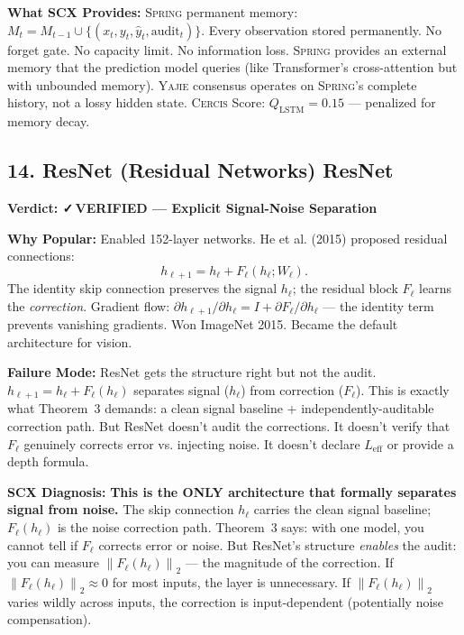 \documentclass[12pt,a4paper]{article}
\theoremstyle{definition}
\newcommand{\verified}{{\color{verifiedcolor}\textbf{✓\,VERIFIED}}}
\newcommand{\Yajie}{\textsc{Yajie}}
\newcommand{\Spring}{\textsc{Spring}}
\newcommand{\Cercis}{\textsc{Cercis}}
\newcommand{\norm}[1]{\left\lVert#1\right\rVert}
\newcommand{\auditHeader}[1]{\medskip\noindent\textbf{\large #1}\medskip}
\newcommand{\whyPopular}{\noindent\textbf{Why Popular:} }
\newcommand{\whyFail}{\noindent\textbf{Failure Mode:} }
\newcommand{\whatMissing}{\noindent\textbf{What SCX Provides:} }
\newcommand{\diagnosis}{\noindent\textbf{SCX Diagnosis:} }
\begin{document}
\whatMissing{} \Spring{} permanent memory: $M_t = M_{t-1} \cup \{(x_t, y_t, \hat{y}_t, \text{audit}_t)\}$. Every observation stored permanently. No forget gate. No capacity limit. No information loss. \Spring{} provides an external memory that the prediction model queries (like Transformer's cross-attention but with unbounded memory). \Yajie{} consensus operates on \Spring{}'s complete history, not a lossy hidden state. \Cercis{} Score: $Q_{\text{LSTM}} = 0.15$ — penalized for memory decay.

\subsection{14. ResNet (Residual Networks) ResNet}

\auditHeader{Verdict: \verified{} — Explicit Signal-Noise Separation}

\whyPopular{} Enabled 152-layer networks. He et al. (2015) proposed residual connections:
\[
h_{\ell+1} = h_\ell + F_\ell(h_\ell; W_\ell).
\]
The identity skip connection preserves the signal $h_\ell$; the residual block $F_\ell$ learns the \textit{correction}. Gradient flow: $\partial h_{\ell+1}/\partial h_\ell = I + \partial F_\ell/\partial h_\ell$ — the identity term prevents vanishing gradients. Won ImageNet 2015. Became the default architecture for vision.

\whyFail{} ResNet gets the structure right but not the audit. $h_{\ell+1} = h_\ell + F_\ell(h_\ell)$ separates signal ($h_\ell$) from correction ($F_\ell$). This is exactly what Theorem~3 demands: a clean signal baseline + independently-auditable correction path. But ResNet doesn't audit the corrections. It doesn't verify that $F_\ell$ genuinely corrects error vs. injecting noise. It doesn't declare $L_{\text{eff}}$ or provide a depth formula.

\diagnosis{} \textbf{This is the ONLY architecture that formally separates signal from noise.} The skip connection $h_\ell$ carries the clean signal baseline; $F_\ell(h_\ell)$ is the noise correction path. Theorem~3 says: with one model, you cannot tell if $F_\ell$ corrects error or noise. But ResNet's structure \textit{enables} the audit: you can measure $\norm{F_\ell(h_\ell)}_2$ — the magnitude of the correction. If $\norm{F_\ell(h_\ell)}_2 \approx 0$ for most inputs, the layer is unnecessary. If $\norm{F_\ell(h_\ell)}_2$ varies wildly across inputs, the correction is input-dependent (potentially noise compensation).
\end{document}
